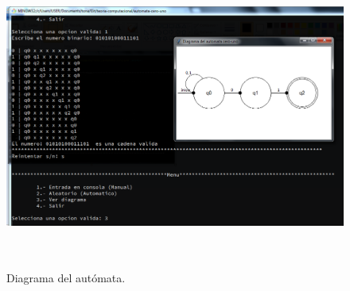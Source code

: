 	\begin{figure}[H]
		\begin{center}
			\includegraphics[width=\linewidth, height=10cm]{img/cero-uno-diagrama.png}
			\caption{Diagrama del autómata.}
			\label{fig:cero-uno3}
		\end{center}
	\end{figure}